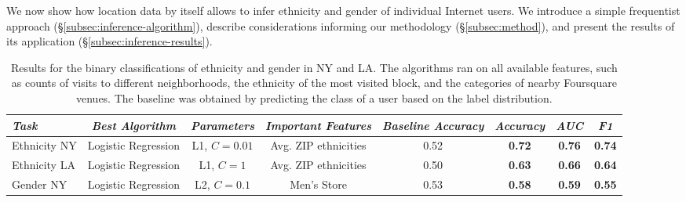 
We now show how location data by itself allows to infer ethnicity and gender of individual Internet users. We introduce a simple frequentist approach (\S\ref{subsec:inference-algorithm}), describe considerations informing our methodology (\S\ref{subsec:method}), and present the results of its application (\S\ref{subsec:inference-results}).


\begin{table}[htb!]
\small
\begin{center}
\begin{tabular}{| l | c | c | c | c | c | c | c |}
\hline
\textit{Task} & \textit{Best Algorithm} & \textit{Parameters} & \textit{Important Features} & \textit{Baseline Accuracy} & \textit{Accuracy} & \textit{AUC} & \textit{F1} \\ \hline
Ethnicity NY    & Logistic Regression  & L1, $C=0.01$  & Avg. ZIP ethnicities & 0.52 & \textbf{0.72} & \textbf{0.76} & \textbf{0.74} \\ \hline
Ethnicity LA     & Logistic Regression  & L1, $C=1$     & Avg. ZIP ethnicities & 0.50 & \textbf{0.63} & \textbf{0.66} & \textbf{0.64} \\ \hline
Gender NY & Logistic Regression & L2, $C=0.1$ & Men's Store &   0.53  & \textbf{0.58} & \textbf{0.59} & \textbf{0.55} \\ \hline
\end{tabular}
\caption{Results for the binary classifications of ethnicity and gender in NY and LA. The algorithms ran on all available features, such as counts of visits to different neighborhoods, the ethnicity of the most visited block, and the categories of nearby Foursquare venues. The baseline was obtained by predicting the class of a user based on the label distribution.}
\label{tab:all-tasks}
\end{center}
\end{table}

